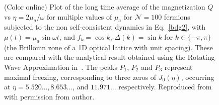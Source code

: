\documentclass[aps,pra,floats,epsfig,pdflatex]{revtex4}                                                              %
\begin{document}
\begin{figure}
\caption{(Color online) Plot of the long time average of the magnetization $Q$ vs  $\eta=2\mu_a/\omega$ for multiple values of $\mu_a$ for $\mathcal{N}=100$ fermions subjected to the non self-consistent dynamics in Eq.~\ref{bdg2}, with $\mu(t)=\mu_a\sin{\omega t}$, and $f_{k}=\cos{k}$, $\Delta(k)=\sin{k}$ for $k\in\{-\pi,\pi\}$ (the Brillouin zone of a 1D optical lattice with unit spacing). These are compared with the analytical result obtained using the Rotating Wave Approximation in~\cite{arnab1}. The peaks $P_{1}$, $P_{2}$
and $P_{3}$ represent maximal freezing, corresponding to three zeros of $J_{0}(\eta)$, occurring at $\eta = 5.520..., 8.653...$, and $11.971...$ respectively. Reproduced from~\cite{arnab1} with permission from author.}
\label{arnabfig}
\end{figure}
\end{document}

